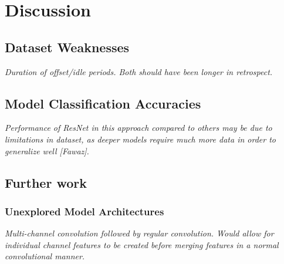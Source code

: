 \chapter{Discussion}

\section{Dataset Weaknesses}

\textit{Duration of offset/idle periods. Both should have been longer in retrospect.}

\section{Model Classification Accuracies}

\textit{Performance of ResNet in this approach compared to others may be due to limitations in dataset, as deeper models require much more data in order to generalize well [Fawaz].}



\section{Further work}
\subsection{Unexplored Model Architectures}
\textit{Multi-channel convolution followed by regular convolution. Would allow for individual channel features to be created before merging features in a normal convolutional manner.}